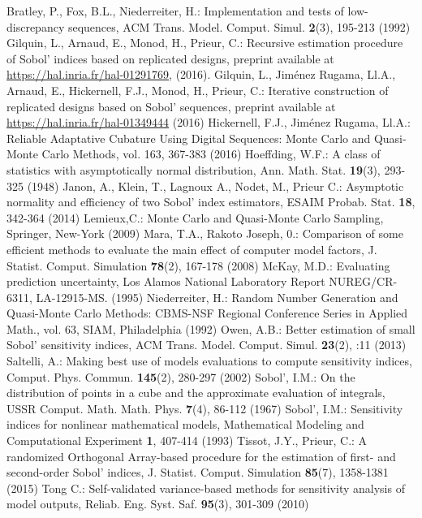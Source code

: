 \begin{thebibliography}{99}
%
%

Bratley, P., Fox, B.L., Niederreiter, H.: Implementation and tests of low-discrepancy sequences, ACM Trans. Model. Comput. Simul. \textbf{2}(3), 195-213 (1992)
Gilquin, L., Arnaud, E., Monod, H., Prieur, C.: Recursive estimation procedure of Sobol' indices based on replicated designs, preprint available at \url{https://hal.inria.fr/hal-01291769}, (2016).
Gilquin, L., Jim\'enez Rugama, Ll.A., Arnaud, E., Hickernell, F.J., Monod, H., Prieur, C.: Iterative construction of replicated designs based on Sobol' sequences, preprint available at \url{https://hal.inria.fr/hal-01349444} (2016)
Hickernell, F.J., Jim\'enez Rugama, Ll.A.: Reliable Adaptative Cubature Using Digital Sequences: Monte Carlo and Quasi-Monte Carlo Methods, vol. 163, 367-383 (2016)
Hoeffding, W.F.: A class of statistics with asymptotically normal distribution, Ann. Math. Stat. \textbf{19}(3), 293-325 (1948)
Janon, A., Klein, T., Lagnoux A., Nodet, M., Prieur C.: Asymptotic normality and efficiency of two {S}obol' index estimators, ESAIM Probab. Stat. \textbf{18}, 342-364 (2014)
Lemieux,C.: Monte Carlo and Quasi-Monte Carlo Sampling, Springer, New-York (2009)
Mara, T.A., Rakoto Joseph, 0.: Comparison of some efficient methods to evaluate the main effect of computer model factors, J. Statist. Comput. Simulation \textbf{78}(2), 167-178 (2008)
McKay, M.D.: Evaluating prediction uncertainty, Los Alamos National Laboratory Report NUREG/CR- 6311, LA-12915-MS. (1995)
Niederreiter, H.: Random Number Generation and Quasi-Monte Carlo Methods: CBMS-NSF Regional Conference Series in Applied Math., vol. 63, SIAM, Philadelphia (1992)
Owen, A.B.: Better estimation of small Sobol' sensitivity indices, ACM Trans. Model. Comput. Simul. \textbf{23}(2), :11 (2013)
Saltelli, A.: Making best use of models evaluations to compute sensitivity indices, Comput. Phys. Commun. \textbf{145}(2), 280-297 (2002)
Sobol', I.M.: On the distribution of points in a cube and the approximate evaluation of integrals, USSR Comput. Math. Math. Phys. \textbf{7}(4), 86-112 (1967)
Sobol', I.M.: Sensitivity indices for nonlinear mathematical models, Mathematical Modeling and Computational Experiment \textbf{1}, 407-414 (1993)
Tissot, J.Y., Prieur, C.: A randomized Orthogonal Array-based procedure for the estimation of first- and second-order Sobol' indices, J. Statist. Comput. Simulation \textbf{85}(7), 1358-1381 (2015)
Tong C.: Self-validated variance-based methods for sensitivity analysis of model outputs, Reliab. Eng. Syst. Saf. \textbf{95}(3), 301-309 (2010)

\end{thebibliography}

